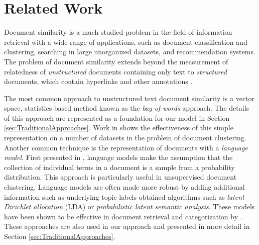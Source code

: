 \documentclass[11pt]{article}
\begin{document}
\section{Related Work} \label{sec:RelatedWork}

Document similarity is a much studied problem in the field of information retrieval with a wide range of applications, such as document classification and clustering, searching in large unorganized datasets, and recommendation systems. The problem of document similarity extends beyond the measurement of relatedness of \emph{unstructured} documents containing only text to \emph{structured} documents, which contain hyperlinks and other annotations \cite{Manning2008}. 

The most common approach to unstructured text document similarity is a vector space, statistics based method known as the  \emph{bag-of-words} approach. The details of this approach are represented as a foundation for our model in Section \ref{sec:TraditionalApproaches}. Work in \cite{Huang2008} shows the effectiveness of this simple representation on a number of datasets in the problem of document clustering. Another common technique is the representation of documents with a \emph{language model}. First presented in \cite{Ponte1998}, language models make the assumption that the collection of individual terms in a document is a sample from a probability distribution. This approach is particularly useful in unsupervised document clustering.  Language models are often made more robust by adding additional information such as underlying topic labels obtained algorithms such as \emph{latent Dirichlet allocation} (LDA) or \emph{probabilistic latent semantic analysis}.  These models have been shown to be effective in document retrieval and categorization by \cite{Hofmann2000}. These approaches are also used in our approach and presented in more detail in Section \ref{sec:TraditionalApproaches}. 
\end{document}
